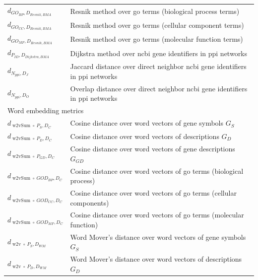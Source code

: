 \documentclass{thesisclass}
\DeclareMathOperator{\wToV}{w2v}
\DeclareMathOperator{\wToVSum}{w2vSum}
\begin{document}
\begin{table}[!h]
\begin{tabularx}{\linewidth}{l|X}
		$\displaystyle d_{GO_{BP}, D_{Resnik,BMA}}$ & Resnik method over \acrshort{go} terms (biological process terms) \\
		$\displaystyle d_{GO_{CC}, D_{Resnik,BMA}}$ & Resnik method over \acrshort{go} terms (cellular component terms) \\
		$\displaystyle d_{GO_{MF}, D_{Resnik,BMA}}$ & Resnik method over \acrshort{go} terms (molecular function terms) \\
		\hline
		$\displaystyle d_{P_{ID}, D_{Dijkstra,BMA}}$ & Dijkstra method over \acrshort{ncbi} gene identifiers in \acrshort{ppi} networks \\
		$\displaystyle d_{N_{ppi}, D_J}$ & Jaccard distance over direct neighbor \acrshort{ncbi} gene identifiers in \acrshort{ppi} networks \\
		$\displaystyle d_{N_{ppi}, D_O}$ & Overlap distance over direct neighbor \acrshort{ncbi} gene identifiers in \acrshort{ppi} networks \\
		\hline
		\multicolumn{2}{l}{Word embedding metrics} \\
		\hline
		$\displaystyle d_{\wToVSum \circ\ P_{S},D_C}$ & Cosine distance over word vectors of gene symbols $G_S$  \\
		$\displaystyle d_{\wToVSum \circ\ P_{D}, D_C}$ & Cosine distance over word vectors of descriptions $G_D$  \\
		$\displaystyle d_{\wToVSum \circ\ P_{GD}, D_C}$ & Cosine distance over word vectors of gene descriptions $G_{GD}$  \\
		$\displaystyle d_{\wToVSum \circ\ GOD_{BP}, D_C}$ & Cosine distance over word vectors of \acrfull{go} terms (biological process)  \\
		$\displaystyle d_{\wToVSum \circ\ GOD_{CC}, D_C}$ & Cosine distance over word vectors of \acrfull{go} terms (cellular components) \\
		$\displaystyle d_{\wToVSum \circ\ GOD_{MF}, D_C}$ & Cosine distance over word vectors of \acrfull{go} terms (molecular function) \\
		$\displaystyle d_{\wToV \circ\ P_{S}, D_{WM}}$ & Word Mover's distance over word vectors of gene symbols $G_S$  \\
		$\displaystyle d_{\wToV \circ\ P_{D}, D_{WM}}$ & Word Mover's distance over word vectors of descriptions $G_D$  \\

\end{tabularx}
\end{table}
\end{document}
